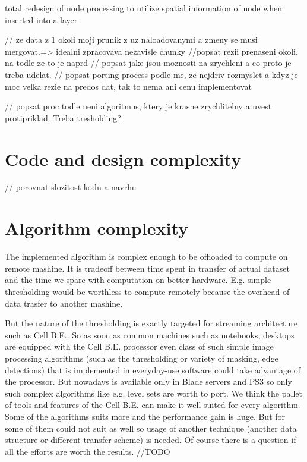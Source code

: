 total redesign of node processing to utilize spatial information of node when inserted into a layer

// ze data z 1 okoli moji prunik z uz naloadovanymi a zmeny se musi mergovat.=> idealni zpracovava nezavisle chunky
//popsat rezii prenaseni okoli, na todle ze to je naprd
// popsat jake jsou moznosti na zrychleni a co proto je treba udelat.
// popsat porting process podle me, ze nejdriv rozmyslet a kdyz je moc velka rezie na predos dat, tak to nema ani cenu implementovat

// popsat proc todle neni algoritmus, ktery je krasne zrychlitelny a uvest protipriklad. Treba tresholding?

\section{Code and design complexity}
// porovnat slozitost kodu a navrhu

\section{Algorithm complexity}

\par
The implemented algorithm is complex enough to be offloaded to compute on remote mashine.
It is tradeoff between time spent in transfer of actual dataset and the time we spare with computation on better hardware.
E.g. simple thresholding would be worthless to compute remotely because the overhead of data trasfer to another mashine.

\par
But the nature of the thresholding is exactly targeted for streaming architecture such as Cell B.E..
So as soon as common machines such as notebooks, desktops are equipped with the Cell B.E. processor even class of such simple image processing algorithms (such as the thresholding or variety of masking, edge detections) that is implemented in everyday-use software could take advantage of the processor.
But nowadays is available only in Blade servers and PS3 so only such complex algorithms like e.g. level sets are worth to port.
We think the pallet of tools and features of the Cell B.E. can make it well suited for every algorithm.
Some of the algorithms suits more and the performance gain is huge.
But for some of them could not suit as well so usage of another technique (another data structure or different transfer scheme) is needed.
Of course there is a question if all the efforts are worth the results. //TODO

